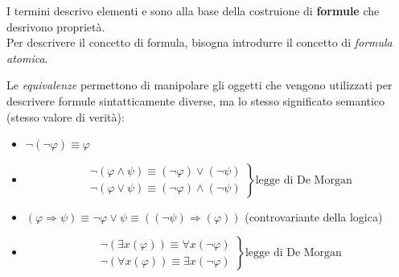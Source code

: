 \documentclass[12pt, a4paper, oneside]{book}
\begin{document}
    I termini descrivo elementi e sono alla base della costruione di \textbf{formule} che desrivono proprietà.\\[0.2ex]
    Per descrivere il concetto di formula, bisogna introdurre il concetto di \textit{formula atomica}.



    Le \textit{equivalenze} permettono di manipolare gli oggetti che vengono utilizzati per descrivere formule sintatticamente diverse, ma lo stesso significato semantico (stesso valore di verità):
    \begin{itemize}
      \item $\neg (\neg \varphi) \equiv \varphi$
      \item \[
        \left.
        \begin{aligned}
        \neg (\varphi \land \psi) \equiv (\neg \varphi) \lor (\neg \psi)\\
        \neg (\varphi \lor \psi) \equiv (\neg \varphi) \land (\neg \psi)
        \end{aligned}
        \right\} \text{legge di De Morgan}
        \]
      \item $(\varphi \Rightarrow \psi) \equiv \neg \varphi \lor \psi \equiv ((\neg \psi) \Rightarrow (\varphi))$ (controvariante della logica)
      \item \[
        \left.
        \begin{aligned}
        \neg (\exists x (\varphi)) \equiv \forall x (\neg \varphi)\\
        \neg (\forall x (\varphi)) \equiv \exists x (\neg \varphi)
        \end{aligned}
        \right\} \text{legge di De Morgan}
        \]
    \end{itemize}
\end{document}
